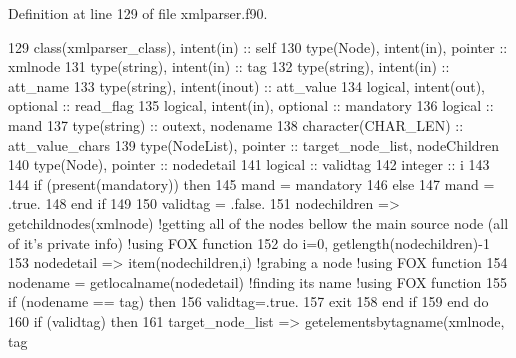 Definition at line 129 of file xmlparser.\+f90.


\begin{DoxyCode}
129     \textcolor{keywordtype}{class}(xmlparser\_class), \textcolor{keywordtype}{intent(in)} :: self
130     \textcolor{keywordtype}{type}(Node), \textcolor{keywordtype}{intent(in)}, \textcolor{keywordtype}{pointer} :: xmlnode
131     \textcolor{keywordtype}{type}(string), \textcolor{keywordtype}{intent(in)} :: tag
132     \textcolor{keywordtype}{type}(string), \textcolor{keywordtype}{intent(in)} :: att\_name
133     \textcolor{keywordtype}{type}(string), \textcolor{keywordtype}{intent(inout)} :: att\_value
134     \textcolor{keywordtype}{logical}, \textcolor{keywordtype}{intent(out)}, \textcolor{keywordtype}{optional} :: read\_flag
135     \textcolor{keywordtype}{logical}, \textcolor{keywordtype}{intent(in)}, \textcolor{keywordtype}{optional} :: mandatory
136     \textcolor{keywordtype}{logical} :: mand
137     \textcolor{keywordtype}{type}(string) :: outext, nodename
138     \textcolor{keywordtype}{character(CHAR\_LEN)} :: att\_value\_chars
139     \textcolor{keywordtype}{type}(NodeList), \textcolor{keywordtype}{pointer} :: target\_node\_list, nodeChildren
140     \textcolor{keywordtype}{type}(Node), \textcolor{keywordtype}{pointer} :: nodedetail
141     \textcolor{keywordtype}{logical} :: validtag
142     \textcolor{keywordtype}{integer} :: i
143 
144     \textcolor{keywordflow}{if} (\textcolor{keyword}{present}(mandatory)) \textcolor{keywordflow}{then}
145         mand = mandatory
146     \textcolor{keywordflow}{else}
147         mand = .true.
148 \textcolor{keywordflow}{    end if}
149 
150     validtag = .false.
151     nodechildren => getchildnodes(xmlnode) \textcolor{comment}{!getting all of the nodes bellow the main source node (all of
       it's private info) !using FOX function}
152     \textcolor{keywordflow}{do} i=0, getlength(nodechildren)-1
153         nodedetail => item(nodechildren,i) \textcolor{comment}{!grabing a node !using FOX function}
154         nodename = getlocalname(nodedetail)  \textcolor{comment}{!finding its name !using FOX function}
155         \textcolor{keywordflow}{if} (nodename == tag) \textcolor{keywordflow}{then}
156             validtag=.true.
157             \textcolor{keywordflow}{exit}
158 \textcolor{keywordflow}{        end if}
159 \textcolor{keywordflow}{    end do}
160     \textcolor{keywordflow}{if} (validtag) \textcolor{keywordflow}{then}
161         target\_node\_list => getelementsbytagname(xmlnode, tag%

\end{DoxyCode}
